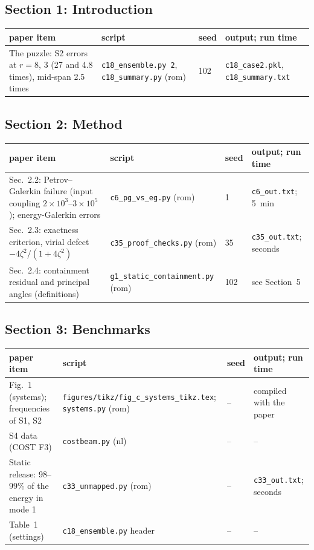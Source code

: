 \documentclass[10pt]{article}
\newcommand{\f}[1]{\texttt{#1}}
\begin{document}
\subsection*{Section 1: Introduction}
\begin{longtable}{L{0.31\textwidth}L{0.25\textwidth}L{0.08\textwidth}L{0.25\textwidth}}
\toprule
paper item & script & seed & output; run time\\ \midrule
The puzzle: S2 errors at $r=8$, 3 (27 and 4.8 times), mid-span 2.5 times & \f{c18\_\allowbreak{}ensemble.py 2}, \f{c18\_\allowbreak{}summary.py} (rom) & 102 & \f{c18\_\allowbreak{}case2.pkl}, \f{c18\_\allowbreak{}summary.txt}\\
\bottomrule
\end{longtable}

\subsection*{Section 2: Method}
\begin{longtable}{L{0.31\textwidth}L{0.25\textwidth}L{0.08\textwidth}L{0.25\textwidth}}
\toprule
paper item & script & seed & output; run time\\ \midrule
Sec.~2.2: Petrov--Galerkin failure (input coupling $2\times10^3$--$3\times10^5$); energy-Galerkin errors & \f{c6\_\allowbreak{}pg\_\allowbreak{}vs\_\allowbreak{}eg.py} (rom) & 1 & \f{c6\_\allowbreak{}out.txt}; 5~min\\
Sec.~2.3: exactness criterion, virial defect $-4\zeta^2/(1+4\zeta^2)$ & \f{c35\_\allowbreak{}proof\_\allowbreak{}checks.py} (rom) & 35 & \f{c35\_\allowbreak{}out.txt}; seconds\\
Sec.~2.4: containment residual and principal angles (definitions) & \f{g1\_\allowbreak{}static\_\allowbreak{}containment.py} (rom) & 102 & see Section~5\\
\bottomrule
\end{longtable}

\subsection*{Section 3: Benchmarks}
\begin{longtable}{L{0.31\textwidth}L{0.25\textwidth}L{0.08\textwidth}L{0.25\textwidth}}
\toprule
paper item & script & seed & output; run time\\ \midrule
Fig.~1 (systems); frequencies of S1, S2 & \f{figures/\allowbreak{}tikz/\allowbreak{}fig\_\allowbreak{}c\_\allowbreak{}systems\_\allowbreak{}tikz.tex}; \f{systems.py} (rom) & -- & compiled with the paper\\
S4 data (COST F3) & \f{costbeam.py} (nl) & -- & --\\
Static release: 98--99\% of the energy in mode 1 & \f{c33\_\allowbreak{}unmapped.py} (rom) & -- & \f{c33\_\allowbreak{}out.txt}; seconds\\
Table~1 (settings) & \f{c18\_\allowbreak{}ensemble.py} header & -- & --\\
\bottomrule
\end{longtable}
\end{document}
